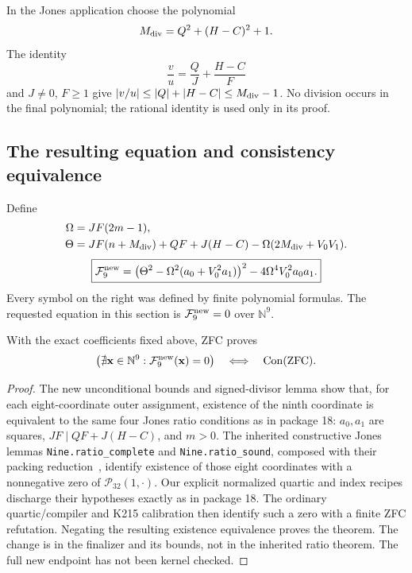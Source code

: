 In the Jones application choose the polynomial
\[
 M_{\rm div}=Q^2+(H-C)^2+1.
\]
The identity
\[
 \frac vu=\frac QJ+\frac{H-C}{F}
\]
and $J\ne0$, $F\ge1$ give
$|v/u|\le|Q|+|H-C|\le M_{\rm div}-1$.
No division occurs in the final polynomial; the rational identity is used
only in its proof.

\subsection{The resulting equation and consistency equivalence}

Define
\begin{align*}
 \Omega&=JF(2m-1),\\
 \Theta&=JF(n+M_{\rm div})+QF+J(H-C)
               -\Omega(2M_{\rm div}+V_0V_1).
\end{align*}
\[
 \boxed{\mathcal F_9^{\rm new}
   =\bigl(\Theta^2-\Omega^2(a_0+V_0^2a_1)\bigr)^2
                   -4\Omega^4V_0^2a_0a_1.}
\]
Every symbol on the right was defined by finite polynomial formulas. The
requested equation in this section is $\mathcal F_9^{\rm new}=0$ over
$\mathbb N^9$.

\begin{theorem}
With the exact coefficients fixed above, ZFC proves
\[
 \bigl(\nexists\mathbf x\in\mathbb N^9:
                \mathcal F_9^{\rm new}(\mathbf x)=0\bigr)
 \quad\Longleftrightarrow\quad\operatorname{Con}(\mathrm{ZFC}).
\]
\end{theorem}
\begin{proof}
The new unconditional bounds and signed-divisor lemma show that,
for each eight-coordinate outer assignment, existence of the ninth
coordinate is equivalent to the same four Jones ratio conditions as
in package 18: $a_0,a_1$ are squares, $JF\mid QF+J(H-C)$, and $m>0$.
The inherited constructive Jones lemmas
\texttt{Nine.ratio\_complete} and \texttt{Nine.ratio\_sound}, composed
with their packing reduction~\cite{jones,ninemain,p18}, identify existence of those eight
coordinates with a nonnegative zero of $\mathcal P_{32}(1,\cdot)$.
Our explicit normalized quartic and index recipes discharge their
hypotheses exactly as in package 18. The ordinary quartic/compiler and
K215 calibration then identify such a zero with a finite ZFC refutation.
Negating the resulting existence equivalence proves the theorem.
The change is in the finalizer and its bounds, not in the inherited
ratio theorem. The full new endpoint has not been kernel checked.
\end{proof}

